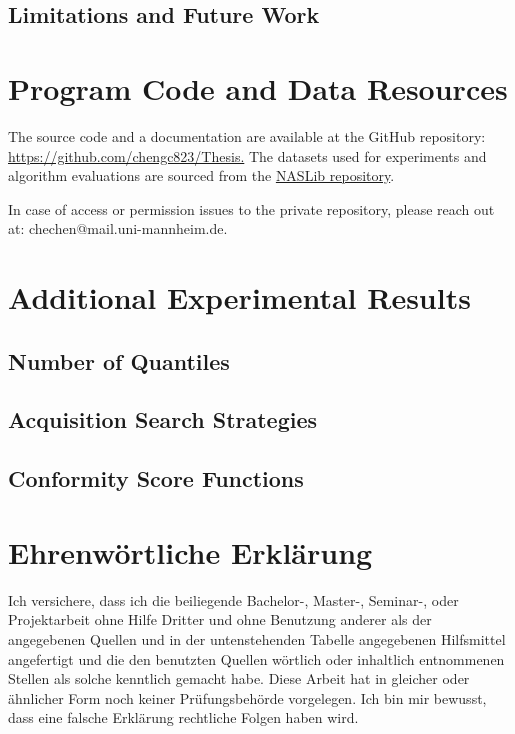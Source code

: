 \documentclass[a4paper,oneside,bibliography=totoc]{scrbook}
\begin{document}
\section{Limitations and Future Work}
\label{sec: future_work}





\listofalgorithms 
\listoffigures 
\listoftables
\printglossary[type=\acronymtype, title=Acronyms]

\appendix
\chapter{Program Code and Data Resources}
The source code and a documentation are available at the GitHub repository: \url{https://github.com/chengc823/Thesis.}
The datasets used for experiments and algorithm evaluations are sourced from the \href{https://github.com/automl/NASLib/tree/Develop}{NASLib repository}.

In case of access or permission issues to the private repository, please reach out at: chechen@mail.uni-mannheim.de.

\chapter{Additional Experimental Results}
\section{Number of Quantiles}
\label{appendix: s1}
\section{Acquisition Search Strategies}
\label{appendix: s2}
\section{Conformity Score Functions}
\label{appendix: s3}


\backmatter
\chapter{Ehrenwörtliche Erklärung}
Ich versichere, dass ich die beiliegende Bachelor-, Master-, Seminar-, oder
Projektarbeit ohne Hilfe Dritter und ohne Benutzung anderer als der angegebenen
Quellen und in der untenstehenden Tabelle angegebenen Hilfsmittel angefertigt
und die den benutzten Quellen wörtlich oder inhaltlich entnommenen Stellen als
solche kenntlich gemacht habe. Diese Arbeit hat in gleicher oder ähnlicher Form
noch keiner Prüfungsbehörde vorgelegen. Ich bin mir bewusst, dass eine falsche
Erklärung rechtliche Folgen haben wird.
\end{document}
